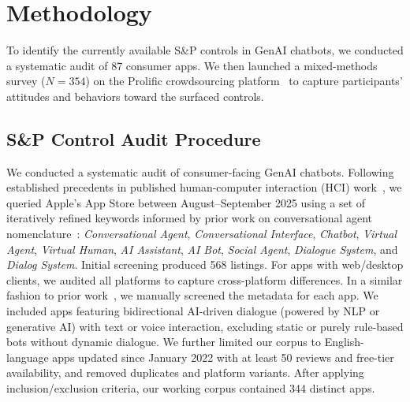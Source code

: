 \documentclass[letterpaper,twocolumn,10pt]{article}
\begin{document}
\section{Methodology} \label{methods}
To identify the currently available S\&P controls in GenAI chatbots, we conducted a systematic audit of 87 consumer apps. We then launched a mixed-methods survey ($N=354$) on the Prolific crowdsourcing platform~\cite{palan2018prolific} to capture participants' attitudes and behaviors toward the surfaced controls. 

\subsection{S\&P Control Audit Procedure}
We conducted a systematic audit of consumer-facing GenAI chatbots. Following established precedents in published human-computer interaction (HCI) work~\cite{lyngs2019self, stawarz2015beyond}, we queried Apple's App Store between August--September 2025 using a set of iteratively refined keywords informed by prior work on conversational agent nomenclature~\cite{zheng2022ux, wang2023investigating}: \emph{Conversational Agent}, \emph{Conversational Interface}, \emph{Chatbot}, \emph{Virtual Agent}, \emph{Virtual Human}, \emph{AI Assistant}, \emph{AI Bot}, \emph{Social Agent}, \emph{Dialogue System}, and \emph{Dialog System}. Initial screening produced 568 listings. For apps with web/desktop clients, we audited all platforms to capture cross-platform differences. In a similar fashion to prior work~\cite{shen2015finding, lyngs2019self}, we manually screened the metadata for each app. We included apps featuring bidirectional AI-driven dialogue (powered by NLP or generative AI) with text or voice interaction, excluding static or purely rule-based bots without dynamic dialogue. We further limited our corpus to English-language apps updated since January 2022 with at least 50 reviews and free-tier availability, and removed duplicates and platform variants. After applying inclusion/exclusion criteria, our working corpus contained 344 distinct apps.
\end{document}

